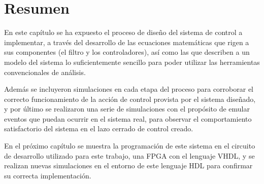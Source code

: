 \section{Resumen}

En este capítulo se ha expuesto el proceso de diseño del sistema de control a implementar, a través del desarrollo de las ecuaciones matemáticas que rigen a sus componentes (el filtro y los controladores), así como las que describen a un modelo del sistema lo suficientemente sencillo para poder utilizar las herramientas convencionales de análisis. 

Además se incluyeron simulaciones en cada etapa del proceso para corroborar el correcto funcionamiento de la acción de control provista por el sistema diseñado, y por último se realizaron una serie de simulaciones con el propósito de emular eventos que puedan ocurrir en el sistema real, para observar el comportamiento satisfactorio del sistema en el lazo cerrado de control creado.

En el próximo capítulo se muestra la programación de este sistema en el circuito de desarrollo utilizado para este trabajo, una FPGA con el lenguaje VHDL, y se realizan nuevas simulaciones en el entorno de este lenguaje HDL para confirmar su correcta implementación. 

\newpage